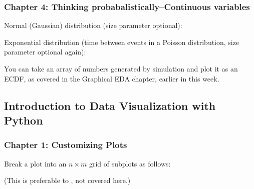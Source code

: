 \documentclass[letterpaper,10pt,english]{jupyterBook}
\begin{document}
\subsubsection{Chapter 4: Thinking probabalistically–Continuous variables}
\label{\detokenize{big-cheat-sheet:chapter-4-thinking-probabalistically-continuous-variables}}
\sphinxAtStartPar
Normal (Gaussian) distribution (size parameter optional):

\begin{sphinxVerbatim}[commandchars=\\\{\}]
      
\end{sphinxVerbatim}

\sphinxAtStartPar
Exponential distribution (time between events in a Poisson distribution,
size parameter optional again):

\begin{sphinxVerbatim}[commandchars=\\\{\}]
     
\end{sphinxVerbatim}

\sphinxAtStartPar
You can take an array of numbers generated by simulation and plot it as an ECDF, as covered in the Graphical EDA chapter, earlier in this week.


\subsection{Introduction to Data Visualization with Python}
\label{\detokenize{big-cheat-sheet:introduction-to-data-visualization-with-python}}
\sphinxAtStartPar
{}


\subsubsection{Chapter 1: Customizing Plots}
\label{\detokenize{big-cheat-sheet:chapter-1-customizing-plots}}
\sphinxAtStartPar
Break a plot into an \(n\times m\) grid of subplots as follows:

\sphinxAtStartPar
(This is preferable to , not covered here.)
\end{document}
